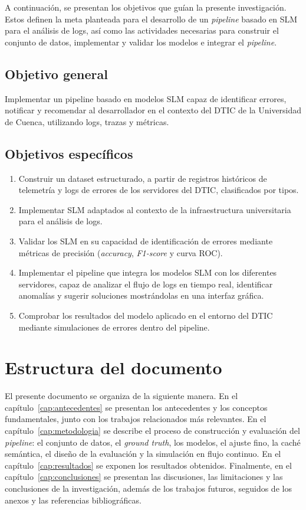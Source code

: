 A continuación, se presentan los objetivos que guían la presente investigación. Estos definen la meta planteada para el desarrollo de un \textit{pipeline} basado en SLM para el análisis de logs, así como las actividades necesarias para construir el conjunto de datos, implementar y validar los modelos e integrar el \textit{pipeline}.

\subsection{Objetivo general}

Implementar un pipeline basado en modelos SLM capaz de identificar errores, notificar y recomendar al desarrollador en el contexto del DTIC de la Universidad de Cuenca, utilizando logs, trazas y métricas.

\subsection{Objetivos específicos}

\begin{enumerate}
  \item Construir un dataset estructurado, a partir de registros históricos de telemetría y logs de errores de los servidores del DTIC, clasificados por tipos.
  \item Implementar SLM adaptados al contexto de la infraestructura universitaria para el análisis de logs.
  \item Validar los SLM en su capacidad de identificación de errores mediante métricas de precisión (\textit{accuracy}, \textit{F1-score} y curva ROC).
  \item Implementar el pipeline que integra los modelos SLM con los diferentes servidores, capaz de analizar el flujo de logs en tiempo real, identificar anomalías y sugerir soluciones mostrándolas en una interfaz gráfica.
  \item Comprobar los resultados del modelo aplicado en el entorno del DTIC mediante simulaciones de errores dentro del pipeline.
\end{enumerate}

\section{Estructura del documento}\label{sec:organizacion}

El presente documento se organiza de la siguiente manera. En el capítulo~\ref{cap:antecedentes} se presentan los antecedentes y los conceptos fundamentales, junto con los trabajos relacionados más relevantes. En el capítulo~\ref{cap:metodologia} se describe el proceso de construcción y evaluación del \textit{pipeline}: el conjunto de datos, el \textit{ground truth}, los modelos, el ajuste fino, la caché semántica, el diseño de la evaluación y la simulación en flujo continuo. En el capítulo~\ref{cap:resultados} se exponen los resultados obtenidos. Finalmente, en el capítulo~\ref{cap:conclusiones} se presentan las discusiones, las limitaciones y las conclusiones de la investigación, además de los trabajos futuros, seguidos de los anexos y las referencias bibliográficas.
